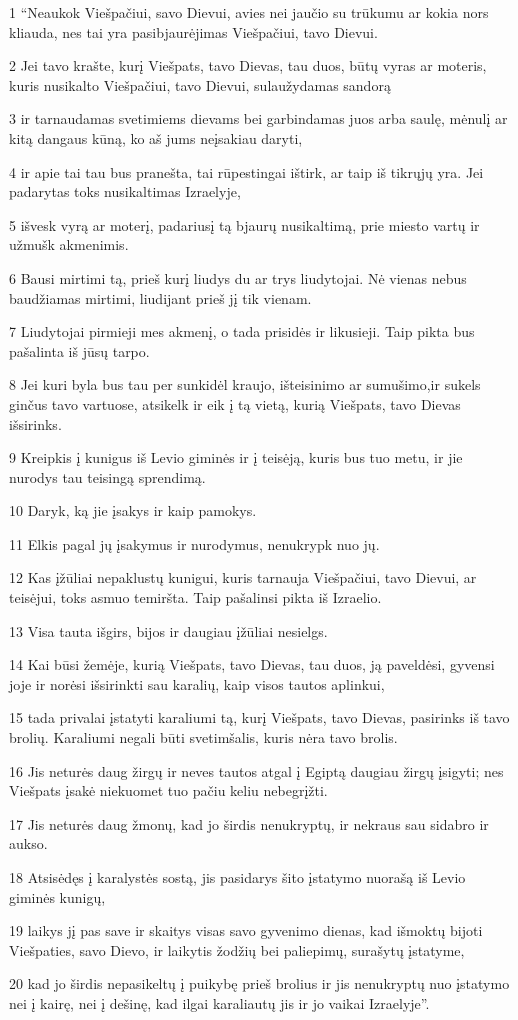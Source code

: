 \par 1 “Neaukok Viešpačiui, savo Dievui, avies nei jaučio su trūkumu ar kokia nors kliauda, nes tai yra pasibjaurėjimas Viešpačiui, tavo Dievui. 
\par 2 Jei tavo krašte, kurį Viešpats, tavo Dievas, tau duos, būtų vyras ar moteris, kuris nusikalto Viešpačiui, tavo Dievui, sulaužydamas sandorą 
\par 3 ir tarnaudamas svetimiems dievams bei garbindamas juos arba saulę, mėnulį ar kitą dangaus kūną, ko aš jums neįsakiau daryti, 
\par 4 ir apie tai tau bus pranešta, tai rūpestingai ištirk, ar taip iš tikrųjų yra. Jei padarytas toks nusikaltimas Izraelyje, 
\par 5 išvesk vyrą ar moterį, padariusį tą bjaurų nusikaltimą, prie miesto vartų ir užmušk akmenimis. 
\par 6 Bausi mirtimi tą, prieš kurį liudys du ar trys liudytojai. Nė vienas nebus baudžiamas mirtimi, liudijant prieš jį tik vienam. 
\par 7 Liudytojai pirmieji mes akmenį, o tada prisidės ir likusieji. Taip pikta bus pašalinta iš jūsų tarpo. 
\par 8 Jei kuri byla bus tau per sunki­dėl kraujo, išteisinimo ar sumušimo,­ir sukels ginčus tavo vartuose, atsikelk ir eik į tą vietą, kurią Viešpats, tavo Dievas išsirinks. 
\par 9 Kreipkis į kunigus iš Levio giminės ir į teisėją, kuris bus tuo metu, ir jie nurodys tau teisingą sprendimą. 
\par 10 Daryk, ką jie įsakys ir kaip pamokys. 
\par 11 Elkis pagal jų įsakymus ir nurodymus, nenukrypk nuo jų. 
\par 12 Kas įžūliai nepaklustų kunigui, kuris tarnauja Viešpačiui, tavo Dievui, ar teisėjui, toks asmuo temiršta. Taip pašalinsi pikta iš Izraelio. 
\par 13 Visa tauta išgirs, bijos ir daugiau įžūliai nesielgs. 
\par 14 Kai būsi žemėje, kurią Viešpats, tavo Dievas, tau duos, ją paveldėsi, gyvensi joje ir norėsi išsirinkti sau karalių, kaip visos tautos aplinkui, 
\par 15 tada privalai įstatyti karaliumi tą, kurį Viešpats, tavo Dievas, pasirinks iš tavo brolių. Karaliumi negali būti svetimšalis, kuris nėra tavo brolis. 
\par 16 Jis neturės daug žirgų ir neves tautos atgal į Egiptą daugiau žirgų įsigyti; nes Viešpats įsakė niekuomet tuo pačiu keliu nebegrįžti. 
\par 17 Jis neturės daug žmonų, kad jo širdis nenukryptų, ir nekraus sau sidabro ir aukso. 
\par 18 Atsisėdęs į karalystės sostą, jis pasidarys šito įstatymo nuorašą iš Levio giminės kunigų, 
\par 19 laikys jį pas save ir skaitys visas savo gyvenimo dienas, kad išmoktų bijoti Viešpaties, savo Dievo, ir laikytis žodžių bei paliepimų, surašytų įstatyme, 
\par 20 kad jo širdis nepasikeltų į puikybę prieš brolius ir jis nenukryptų nuo įstatymo nei į kairę, nei į dešinę, kad ilgai karaliautų jis ir jo vaikai Izraelyje”.



